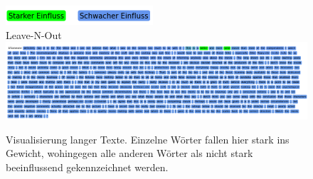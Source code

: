 \documentclass[DIV=13,fontsize=11pt]{scrartcl}
\begin{document}
\begin{figure}[H]
    \centering
    \includegraphics[]{img/legend.png}\\
    Leave-N-Out\\
    \includegraphics[width=\linewidth]{img/long_ex_lno.png}
    \caption{Visualisierung langer Texte. Einzelne Wörter fallen hier stark ins Gewicht, wohingegen alle anderen Wörter als nicht stark beeinflussend gekennzeichnet werden.}
    \label{fig:ex6}
\end{figure}
\end{document}
